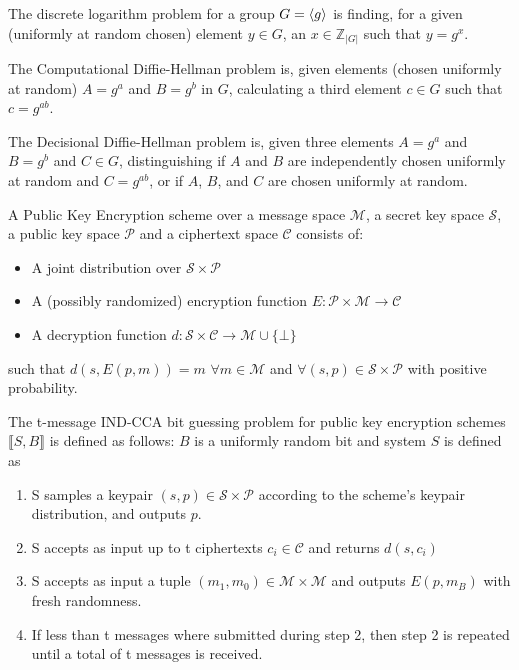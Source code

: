 \documentclass[a4paper,german]{article}
\newenvironment{customdef}[1]{\renewcommand\theinnercustomdef{#1}\innercustomdef}{\endinnercustomdef}
\begin{document}
\begin{customdef}{3.8}
	The discrete logarithm problem for a group $G = \braket{g}$ is finding, for a given (uniformly at random chosen) element $y \in G$, an $x \in \mathbb{Z}_{|G|}$ such that $y = g^x$.
\end{customdef}

\begin{customdef}{3.9}
	The Computational Diffie-Hellman problem is, given elements (chosen uniformly at random) $A = g^a$ and $B = g^b$ in $G$, calculating a third element $c \in G$ such that $c = g^{ab}$.
\end{customdef}

\begin{customdef}{3.10}
	The Decisional Diffie-Hellman problem is, given three elements  $A = g^a$ and $B = g^b$ and $C \in G$, distinguishing if $A$ and $B$ are independently chosen uniformly at random and $C = g^{ab}$, or if $A$, $B$, and $C$ are chosen uniformly at random.
\end{customdef}

\begin{customdef}{3.11}
	A Public Key Encryption scheme over a message space $\mathcal{M}$, a secret key space $\mathcal{S}$, a public key space $\mathcal{P}$ and a ciphertext space $\mathcal{C}$ consists of:

	\begin{itemize}

		\item  A joint distribution over $\mathcal{S \times P}$
		\item  A (possibly randomized) encryption function $E: \mathcal{P \times M} \rightarrow \mathcal{C}$
		\item  A decryption function $d: \mathcal{S \times C} \rightarrow \mathcal{M} \cup \{\bot\}$
	\end{itemize}
	such that $d(s, E(p, m)) = m$ $\forall m \in \mathcal{M}$ and $\forall (s, p) \in \mathcal{S \times P}$ with positive probability.
\end{customdef}

\begin{customdef}{3.12}
	The t-message IND-CCA bit guessing problem for public key encryption schemes $\llbracket S, B\rrbracket$ is defined as follows: $B$ is a uniformly random bit and system $S$ is defined as

	\begin{enumerate}

		\item  S samples a keypair $(s, p) \in \mathcal{S \times P}$ according to the scheme's keypair distribution, and outputs $p$.
		\item  S accepts as input up to t ciphertexts $c_i \in \mathcal{C}$ and returns $d(s, c_i)$
		\item  S accepts as input a tuple $(m_1, m_0) \in \mathcal{M \times M}$ and outputs $E(p, m_B)$ with fresh randomness.
		\item  If less than t messages where submitted during step 2, then step 2 is repeated until a total of t messages is received.

	\end{enumerate}
\end{customdef}
\end{document}
